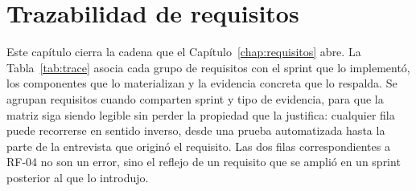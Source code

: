\chapter{Trazabilidad de requisitos}
\label{chap:trazabilidad}

Este capítulo cierra la cadena que el Capítulo~\ref{chap:requisitos} abre. La Tabla~\ref{tab:trace} asocia cada grupo de requisitos con el sprint que lo implementó, los componentes que lo materializan y la evidencia concreta que lo respalda. Se agrupan requisitos cuando comparten sprint y tipo de evidencia, para que la matriz siga siendo legible sin perder la propiedad que la justifica: cualquier fila puede recorrerse en sentido inverso, desde una prueba automatizada hasta la parte de la entrevista que originó el requisito. Las dos filas correspondientes a RF-04 no son un error, sino el reflejo de un requisito que se amplió en un sprint posterior al que lo introdujo.

